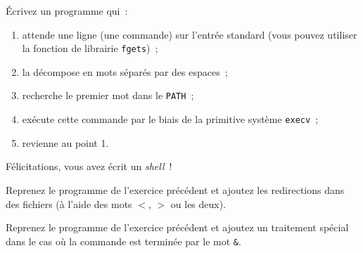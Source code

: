 \question

Écrivez un programme qui~:

\begin {enumerate}
    \item attende une ligne (une commande) sur l'entrée standard (vous
	pouvez utiliser la fonction de librairie {\tt fgets})~;

    \item la décompose en mots séparés par des espaces~;

    \item recherche le premier mot dans le {\tt PATH}~;

    \item exécute cette commande par le biais de la primitive système
	{\tt execv}~;
    
    \item revienne au point 1.

\end {enumerate}

Félicitations, vous avez écrit un {\em shell}~!


\question

Reprenez le programme de l'exercice précédent et ajoutez les
redirections dans des fichiers (à l'aide des mots $<$, $>$ ou les
deux).


\question
\label{q:minishell}

Reprenez le programme de l'exercice précédent et ajoutez un traitement
spécial dans le cas où la commande est terminée par le mot \verb:&:.

